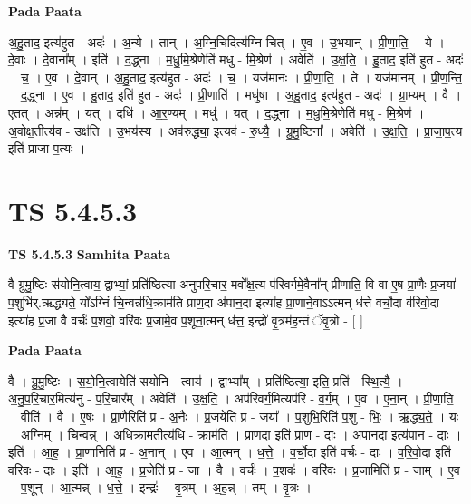 \documentclass[17pt]{extarticle}
\begin{document}
\textbf{Pada Paata} \newline

अ॒हु॒ताद॒ इत्य॑हुत - अदः॑ । अ॒न्ये । तान् । अ॒ग्नि॒चिदित्य॑ग्नि-चित् । ए॒व । उ॒भयान्॑ । प्री॒णा॒ति॒ । ये । दे॒वाः । दे॒वाना᳚म् । इति॑ । द॒द्ध्ना । म॒धु॒मि॒श्रेणेति॑ मधु - मि॒श्रेण॑ । अवेति॑ । उ॒क्ष॒ति॒ । हु॒ताद॒ इति॑ हुत - अदः॑ । च॒ । ए॒व । दे॒वान् । अ॒हु॒ताद॒ इत्य॑हुत - अदः॑ । च॒ । यज॑मानः । प्री॒णा॒ति॒ । ते । यज॑मानम् । प्री॒ण॒न्ति॒ । द॒द्ध्ना । ए॒व । हु॒ताद॒ इति॑ हुत - अदः॑ । प्री॒णाति॑ । मधु॑षा । अ॒हु॒ताद॒ इत्य॑हुत - अदः॑ । ग्रा॒म्यम् । वै । ए॒तत् । अन्न᳚म् । यत् । दधि॑ । आ॒र॒ण्यम् । मधु॑ । यत् । द॒द्ध्ना । म॒धु॒मि॒श्रेणेति॑ मधु - मि॒श्रेण॑ । अ॒वोक्ष॒तीत्य॑व - उक्ष॑ति । उ॒भय॑स्य । अव॑रुद्ध्या॒ इत्यव॑ - रु॒ध्यै॒ । ग्रु॒मु॒ष्टिना᳚ । अवेति॑ । उ॒क्ष॒ति॒ । प्रा॒जा॒प॒त्य इति॑ प्राजा-प॒त्यः ।  \newline





\section{ TS 5.4.5.3 }

\textbf{TS 5.4.5.3 } \newline
\textbf{Samhita Paata} \newline

वै ग्रु॑मु॒ष्टिः स॑योनि॒त्वाय॒ द्वाभ्यां॒ प्रति॑ष्ठित्या अनुपरि॒चार॒-मवो᳚क्ष॒त्य-प॑रिवर्गमे॒वैना᳚न् प्रीणाति॒ वि वा ए॒ष प्रा॒णैः प्र॒जया॑ प॒शुभि॑र्.ऋद्ध्यते॒ यो᳚ऽग्निं चि॒न्वन्न॑धि॒क्राम॑ति प्राण॒दा अ॑पान॒दा इत्या॑ह प्रा॒णाने॒वाऽऽत्मन् ध॑त्ते वर्चो॒दा व॑रिवो॒दा इत्या॑ह प्र॒जा वै वर्चः॑ प॒शवो॒ वरि॑वः प्र॒जामे॒व प॒शूना॒त्मन् ध॑त्त॒ इन्द्रो॑ वृ॒त्रम॑ह॒न्तं ॅवृ॒त्रो - [  ] \newline

\textbf{Pada Paata} \newline

वै । ग्रु॒मु॒ष्टिः । स॒यो॒नि॒त्वायेति॑ सयोनि - त्वाय॑ । द्वाभ्या᳚म् । प्रति॑ष्ठित्या॒ इति॒ प्रति॑ - स्थि॒त्यै॒ । अ॒नु॒प॒रि॒चार॒मित्य॑नु - प॒रि॒चार᳚म् । अवेति॑ । उ॒क्ष॒ति॒ । अप॑रिवर्ग॒मित्यप॑रि - व॒र्ग॒म् । ए॒व । ए॒ना॒न् । प्री॒णा॒ति॒ । वीति॑ । वै । ए॒षः । प्रा॒णैरिति॑ प्र - अ॒नैः । प्र॒जयेति॑ प्र - जया᳚ । प॒शुभि॒रिति॑ प॒शु - भिः॒ । ऋ॒द्ध्य॒ते॒ । यः । अ॒ग्निम् । चि॒न्वन्न् । अ॒धि॒क्राम॒तीत्य॑धि - क्राम॑ति । प्रा॒ण॒दा इति॑ प्राण - दाः । अ॒पा॒न॒दा इत्य॑पान - दाः । इति॑ । आ॒ह॒ । प्रा॒णानिति॑ प्र - अ॒नान् । ए॒व । आ॒त्मन् । ध॒त्ते॒ । व॒र्चो॒दा इति॑ वर्चः - दाः । व॒रि॒वो॒दा इति॑ वरिवः - दाः । इति॑ । आ॒ह॒ । प्र॒जेति॑ प्र - जा । वै । वर्चः॑ । प॒शवः॑ । वरि॑वः । प्र॒जामिति॑ प्र - जाम् । ए॒व । प॒शून् । आ॒त्मन्न् । ध॒त्ते॒ । इन्द्रः॑ । वृ॒त्रम् । अ॒ह॒न्न् । तम् । वृ॒त्रः ।  \newline
\end{document}
